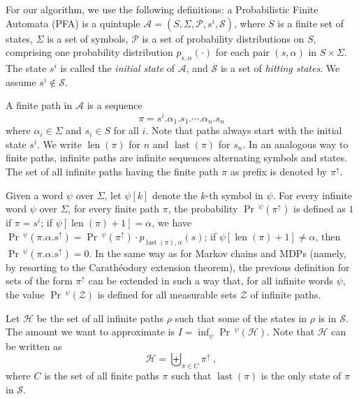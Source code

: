\documentclass[final,3p,times,twocolumn]{elsarticle}
\theoremstyle{plain}
\theoremstyle{definition}
\newcommand{\state}{s}
\newcommand{\states}{S}
\newcommand{\alphabet}{\Sigma}
\newcommand{\allprobs}{\mathcal{P}}
\newcommand{\initstate}{\state^{i}}
\newcommand{\reachset}{\mathcal{S}}
\newcommand{\sys}{\mathcal{A}}
\newcommand{\prob}[3]{p_{{#1},{#2}}(#3)}
\newcommand{\smbol}{\alpha}
\newcommand{\plength}{n}
\newcommand{\statesi}{i}
\newcommand{\fpath}{\pi}
\newcommand{\ipath}{\rho}
\newcommand{\extension}[1]{{#1}^{\uparrow}}
\DeclareMathOperator{\lastWord}{last}
\newcommand{\last}[1]{\lastWord({#1})}
\newcommand{\infimum}{I}
\newcommand{\phit}{\mathcal{H}}
\newcommand{\measset}{\mathcal{Z}}
\DeclareMathOperator{\lenWord}{len}
\newcommand{\len}[1]{\lenWord({#1})}
\newcommand{\iword}{\psi}
\DeclareMathOperator{\prWord}{Pr}
\newcommand{\pr}{\prWord\,\!}
\begin{document}
For our algorithm, we use the following definitions: a Probabilistic Finite
Automata (PFA) is a quintuple
$\sys = (\states,\alphabet,\allprobs,\initstate,\reachset)$, where
$\states$ is a finite set of states, $\alphabet$ is a set of symbols,
$\allprobs$ is a set of probability distributions on $\states$, comprising
one probability distribution $\prob{\state}{\alpha}{\cdot}$ for each
pair $(\state,\alpha)$ in $\states \times \alphabet$. The state $\initstate$
is called the \emph{initial state} of $\sys$, and $\reachset$ is a set of
\emph{hitting states}. We assume $\initstate \not\in \reachset$.

A finite path in $\sys$ is a sequence
\[ \fpath = \initstate.\smbol_{1}.\state_{1}.\cdots
								.\smbol_{\plength}.\state_{\plength} \]
where $\smbol_{\statesi} \in \alphabet$ and $\state_{\statesi} \in \states$
for all $\statesi$. Note that paths always start with the initial state
$\initstate$. We write $\len{\fpath}$ for $\plength$ and $\last{\fpath}$
for $\state_{\plength}$. In an analogous way to finite paths, infinite paths
are infinite sequences alternating symbols and states. The set of all infinite
paths having the finite path $\fpath$ as prefix is denoted by
$\extension{\fpath}$.

Given a word $\iword$ over $\alphabet$, let $\iword[k]$ denote the $k$-th
symbol in $\iword$. For every infinite word $\iword$ over $\alphabet$,
for every finite path $\fpath$, the probability
$\pr^{\iword}(\extension{\fpath})$ is defined as $1$
if $\fpath = \initstate$; if $\iword[\len{\fpath}+1] = \smbol$, we have
$\pr^{\iword}(\extension{\fpath.\smbol.\state})
	= \pr^{\iword}(\extension{\fpath})
				\cdot \prob{\last{\fpath}}{\smbol}{\state}$; if
$\iword[\len{\fpath}+1] \not= \smbol$, then
$\pr^{\iword}(\extension{\fpath.\smbol.\state}) = 0$.
In the same way as for Markov chains and MDPs (namely, by resorting to the
Carath\'eodory extension theorem), the previous definition for sets of the form
$\extension{\fpath}$ can be extended in such a way that, for all infinite
words $\iword$, the value $\pr^{\iword}(\measset)$ is defined for all
measurable sets $\measset$ of infinite paths.

Let $\phit$ be the set of all infinite paths $\ipath$ such that
some of the states in $\ipath$ is in $\reachset$. The amount we want to
approximate is $\infimum = \inf_{\iword} \pr^{\iword}(\phit)$. Note that
$\phit$ can be written as 
\begin{equation}
\label{eq:def-phit}
\phit = \biguplus_{\fpath \in C} \extension{\fpath} \; ,
\end{equation}
where $C$ is the set of all finite paths $\fpath$ such that $\last{\fpath}$
is the only state of $\fpath$ in $\reachset$.
\end{document}
